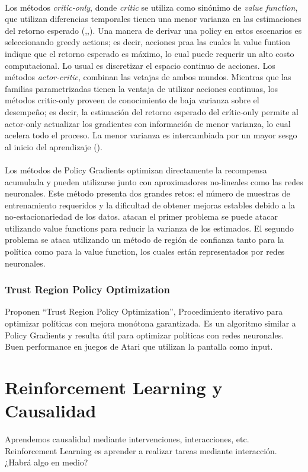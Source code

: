 \documentclass[11pt]{article}
\theoremstyle{plain}
\begin{document}
 \\
Los métodos \textit{critic-only}, donde \textit{critic} se utiliza como sinónimo de \textit{value function}, que utilizan diferencias temporales tienen una menor varianza en las estimaciones del retorno esperado (\cite{boyan2002technical},\cite{berenji2003convergent},\cite{sutton1988learning}). Una manera de derivar una policy en estos escenarios es seleccionando greedy actions; es decir, acciones praa las cuales la value funtion indique que el retorno esperado es máximo, lo cual puede requerir un alto costo computacional. Lo usual es discretizar el espacio continuo de acciones.
Los métodos \textit{actor-critic}, combinan las vetajas de ambos mundos. Mientras que las familias parametrizadas tienen la ventaja de utilizar acciones continuas, los métodos critic-only proveen de conocimiento de baja varianza sobre el desempeño; es decir, la estimación del retorno esperado del crític-only permite al actor-only actualizar los gradientes con información de menor varianza, lo cual acelera todo el proceso. La menor varianza es intercambiada por un mayor sesgo al inicio del aprendizaje (\cite{berenji2003convergent}). \\
\\
Los métodos de Policy Gradients optimizan directamente la recompensa acumulada y pueden utilizarse junto con aproximadores no-lineales como las redes neuronales. Este método presenta dos grandes retos: el número de muestras de entrenamiento requeridos y la dificultad de obtener mejoras estables debido a la no-estacionariedad de los datos.  \cite{DBLP:journals/corr/SchulmanMLJA15} atacan el primer problema se puede atacar utilizando value functions para reducir la varianza de los estimados. El segundo problema se ataca utilizando un método de región de confianza tanto para la política como para la value function, los cuales están representados por redes neuronales.\\
\subsubsection{Trust Region Policy Optimization}
 \cite{DBLP:journals/corr/SchulmanLMJA15} Proponen “Trust Region Policy Optimization”, Procedimiento iterativo para optimizar políticas con mejora monótona garantizada. Es un algoritmo similar a Policy Gradients y resulta útil para optimizar políticas con redes neuronales. Buen performance en juegos de Atari que utilizan la pantalla como input.
\section{Reinforcement Learning y Causalidad}
Aprendemos causalidad mediante intervenciones, interacciones, etc. Reinforcement Learning es aprender a realizar tareas mediante interacción. ¿Habrá algo en medio?
\end{document}
